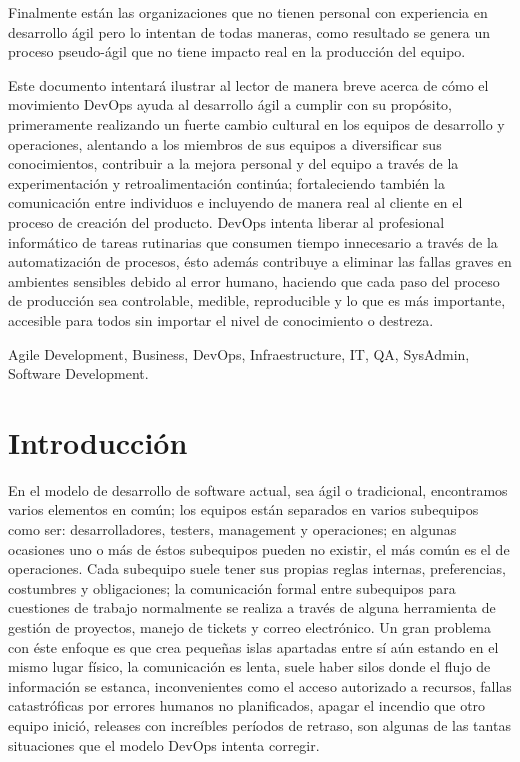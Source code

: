 \documentclass[conference]{IEEEtran}
\begin{document}
Finalmente están las organizaciones que no tienen personal con experiencia en desarrollo ágil pero lo intentan de todas maneras, como resultado se genera un proceso pseudo-ágil que no tiene impacto real en la producción del equipo.

Este documento intentará ilustrar al lector de manera breve acerca de cómo el movimiento DevOps ayuda al desarrollo ágil a cumplir con su propósito, primeramente realizando un fuerte cambio cultural en los equipos de desarrollo y operaciones, alentando a los miembros de sus equipos a diversificar sus conocimientos, contribuir a la mejora personal y del equipo a través de la experimentación y retroalimentación continúa; fortaleciendo también la comunicación entre individuos e incluyendo de manera real al cliente en el proceso de creación del producto. DevOps intenta liberar al profesional informático de tareas rutinarias que consumen tiempo innecesario a través de la automatización de procesos, ésto además contribuye a eliminar las fallas graves en ambientes sensibles debido al error humano, haciendo que cada paso del proceso de producción sea controlable, medible, reproducible y lo que es más importante, accesible para todos sin importar el nivel de conocimiento o destreza.


\begin{keywords}
  Agile Development, Business, DevOps, Infraestructure, IT, QA, SysAdmin, Software Development.
\end{keywords}

%
\IEEEpeerreviewmaketitle



\section{Introducción}
En el modelo de desarrollo de software actual, sea ágil o tradicional, encontramos varios elementos en común; los equipos están separados en varios subequipos como ser: desarrolladores, testers, management y operaciones; en algunas ocasiones uno o más de éstos subequipos pueden no existir, el más común es el de operaciones. Cada subequipo suele tener sus propias reglas internas, preferencias, costumbres y obligaciones; la comunicación formal entre subequipos para cuestiones de trabajo normalmente se realiza a través de alguna herramienta de gestión de proyectos, manejo de tickets y correo electrónico. Un gran problema con éste enfoque es que crea pequeñas islas apartadas entre sí aún estando en el mismo lugar físico, la comunicación es lenta, suele haber silos donde el flujo de información se estanca, inconvenientes como el acceso autorizado a recursos, fallas catastróficas por errores humanos no planificados, apagar el incendio que otro equipo inició, releases con increíbles períodos de retraso, son algunas de las tantas situaciones que el modelo DevOps intenta corregir. 
\end{document}
